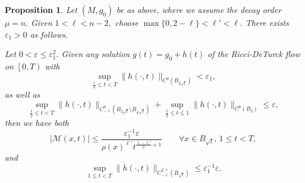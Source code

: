 \documentclass[12pt]{amsart}
\newcommand{\calM}{\mathcal{M}}
\renewcommand{\1}{{\mathbf 1}}
\newcommand{\eps}{{\varepsilon}}
\newtheorem{prop}[thm]{Proposition}
\theoremstyle{others}
\numberwithin{equation}{section}
\begin{document}
\begin{prop}\label{prop:cutoffMestimate}
        Let $(M,g_0)$ be as above, where we assume the decay order $\mu = n.$ Given $1< \ell < n-2,$ choose $\max\{ 0, 2-\ell \} <  \ell' < \ell .$ There exists $\eps_1 > 0$ as follows.
    
    Let $0 < \eps \leq \eps_1^2.$ Given any solution $g(t) = g_0 + h(t)$ of the Ricci-DeTurck flow on $\left[ 0, T \right)$ with
    \begin{equation}\label{cutoffMestimate:C0bound}
        \sup_{\frac12 \le t < T} \|h(\cdot ,t) \|_{C^0 ( B_{2 \sqrt t} ) } < \eps_1,
    \end{equation} 
    as well as
    \begin{equation}\label{cutuffMestimate:C20bound}
        \sup_{\frac12 \le t < T} \| h(\cdot, t) \|_{C^0_{-\ell}( B_{2 \sqrt t} \setminus \overline B_{\frac12 \sqrt t})}
        + \sup_{\frac12 \le t \le 1} \| h(\cdot, t) \|_{C^0( B_{2}) }
        \le \eps,
    \end{equation}
    then we have both
    \begin{equation}\label{cutoffMestimate:Mestimate}
        |\calM(x,t)| \leq \frac{\eps_1^{-1} \eps }{ \rho(x)^{\ell'} t^{\frac{\ell - \ell'}{2} + 1}}
        \qquad \forall x \in B_{\sqrt t} , \, 1 \le t < T,
    \end{equation}
    and
    \begin{equation} \label{cutoffMestimate:gestimate}
        \sup_{1 \le t < T} \| h (\cdot, t) \|_{C^{2, \gamma}_{-\ell}( B_{\sqrt t} ) } \le \eps_1^{-1} \eps.
    \end{equation}
\end{prop}
\end{document}
